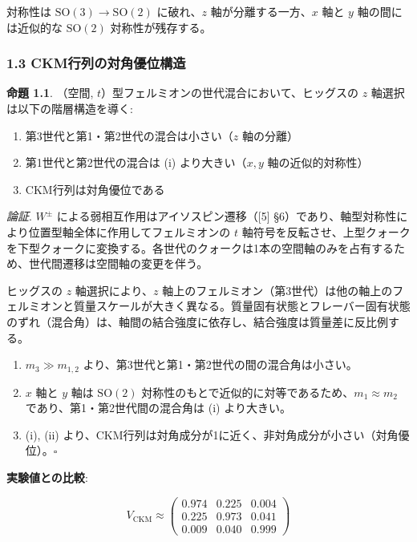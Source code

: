 \documentclass[
  a4paper,11pt]{ltjsarticle}
\begin{document}
対称性は \(\mathrm{SO}(3) \to \mathrm{SO}(2)\) に破れ、\(z\)
軸が分離する一方、\(x\) 軸と \(y\) 軸の間には近似的な \(\mathrm{SO}(2)\)
対称性が残存する。

\subsubsection{1.3
CKM行列の対角優位構造}\label{ckmux884cux5217ux306eux5bfeux89d2ux512aux4f4dux69cbux9020}

\textbf{命題 1.1}. （空間,
\(t\)）型フェルミオンの世代混合において、ヒッグスの \(z\)
軸選択は以下の階層構造を導く:

\begin{enumerate}
\def\labelenumi{(\roman{enumi})}
\item
  第3世代と第1・第2世代の混合は小さい（\(z\) 軸の分離）
\item
  第1世代と第2世代の混合は (i) より大きい（\(x, y\) 軸の近似的対称性）
\item
  CKM行列は対角優位である
\end{enumerate}

\emph{論証}. \(W^{\pm}\) による弱相互作用はアイソスピン遷移（{[}5{]}
§6）であり、軸型対称性により位置型軸全体に作用してフェルミオンの \(t\)
軸符号を反転させ、上型クォークを下型クォークに変換する。各世代のクォークは1本の空間軸のみを占有するため、世代間遷移は空間軸の変更を伴う。

ヒッグスの \(z\) 軸選択により、\(z\)
軸上のフェルミオン（第3世代）は他の軸上のフェルミオンと質量スケールが大きく異なる。質量固有状態とフレーバー固有状態のずれ（混合角）は、軸間の結合強度に依存し、結合強度は質量差に反比例する。

\begin{enumerate}
\def\labelenumi{(\roman{enumi})}
\item
  \(m_3 \gg m_{1,2}\) より、第3世代と第1・第2世代の間の混合角は小さい。
\item
  \(x\) 軸と \(y\) 軸は \(\mathrm{SO}(2)\)
  対称性のもとで近似的に対等であるため、\(m_1 \approx m_2\)
  であり、第1・第2世代間の混合角は (i) より大きい。
\item
  (i), (ii)
  より、CKM行列は対角成分が1に近く、非対角成分が小さい（対角優位）。\(\square\)
\end{enumerate}

\textbf{実験値との比較}:

\[V_{\text{CKM}} \approx \begin{pmatrix} 0.974 & 0.225 & 0.004 \\ 0.225 & 0.973 & 0.041 \\ 0.009 & 0.040 & 0.999 \end{pmatrix}\]
\end{document}
